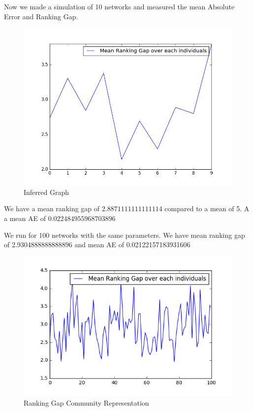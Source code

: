 \documentclass[12pt]{ociamthesis}  %
\begin{document}
	Now we made a simulation of 10 networks and measured the mean Absolute Error and Ranking Gap.
	
	\begin{figure}
		\centering
		\includegraphics[width=\textwidth,height=\textheight,keepaspectratio]{SimulationGap}
		\caption{Inferred Graph}
		\label{label-image12}
	\end{figure}
	
	We have a mean ranking gap of $2.8871111111111114$ compared to a mean of 5. A a mean AE of $0.022484955968703896$
	
	
	We run for 100 networks with the same parameters.
	We have mean ranking gap of 2.9304888888888896 and mean AE of 0.02122157183931606
	
	\begin{figure}
		\centering
		\includegraphics[width=\textwidth,height=\textheight,keepaspectratio]{SimulationGap100}
		\caption{Ranking Gap Community Representation}
		\label{label-image13}
	\end{figure}
	
\end{document}
